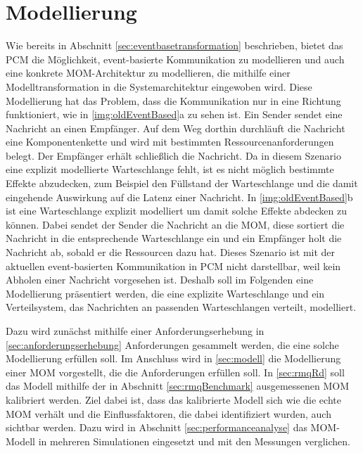
\chapter{Modellierung}
\label{ch:modellierung}
Wie bereits in Abschnitt \ref{sec:eventbasetransformation} beschrieben, bietet das PCM die Möglichkeit, event-basierte Kommunikation zu modellieren und auch eine konkrete MOM-Architektur zu modellieren, die mithilfe einer Modelltransformation in die Systemarchitektur eingewoben wird. Diese Modellierung hat das Problem, dass die Kommunikation nur in eine Richtung funktioniert, wie in \autoref{img:oldEventBased}a zu sehen ist. Ein Sender sendet eine Nachricht an einen Empfänger. Auf dem Weg dorthin durchläuft die Nachricht eine Komponentenkette und wird mit bestimmten Ressourcenanforderungen belegt. Der Empfänger erhält schließlich die Nachricht. Da in diesem Szenario eine explizit modellierte Warteschlange fehlt, ist es nicht möglich bestimmte Effekte abzudecken, zum Beispiel den Füllstand der Warteschlange und die damit eingehende Auswirkung auf die Latenz einer Nachricht. In \autoref{img:oldEventBased}b ist eine Warteschlange explizit modelliert um damit solche Effekte abdecken zu können. Dabei sendet der Sender die Nachricht an die MOM, diese sortiert die Nachricht in die entsprechende Warteschlange ein und ein Empfänger holt die Nachricht ab, sobald er die Ressourcen dazu hat. Dieses Szenario ist mit der aktuellen event-basierten Kommunikation in PCM nicht darstellbar, weil kein Abholen einer Nachricht vorgesehen ist. Deshalb soll im Folgenden eine Modellierung präsentiert werden, die eine explizite Warteschlange und ein Verteilsystem, das Nachrichten an passenden Warteschlangen verteilt, modelliert.\par
Dazu wird zunächst mithilfe einer Anforderungserhebung in \autoref{sec:anforderungserhebung} Anforderungen gesammelt werden, die eine solche Modellierung erfüllen soll. Im Anschluss wird in \autoref{sec:modell} die Modellierung einer MOM vorgestellt, die die Anforderungen erfüllen soll. In \autoref{sec:rmqRd} soll das Modell mithilfe der in Abschnitt \ref{sec:rmqBenchmark} ausgemessenen MOM kalibriert werden. Ziel dabei ist, dass das kalibrierte Modell sich wie die echte MOM verhält und die Einflussfaktoren, die dabei identifiziert wurden, auch sichtbar werden. Dazu wird in Abschnitt \ref{sec:performanceanalyse} das MOM-Modell in mehreren Simulationen eingesetzt und mit den Messungen verglichen. 
